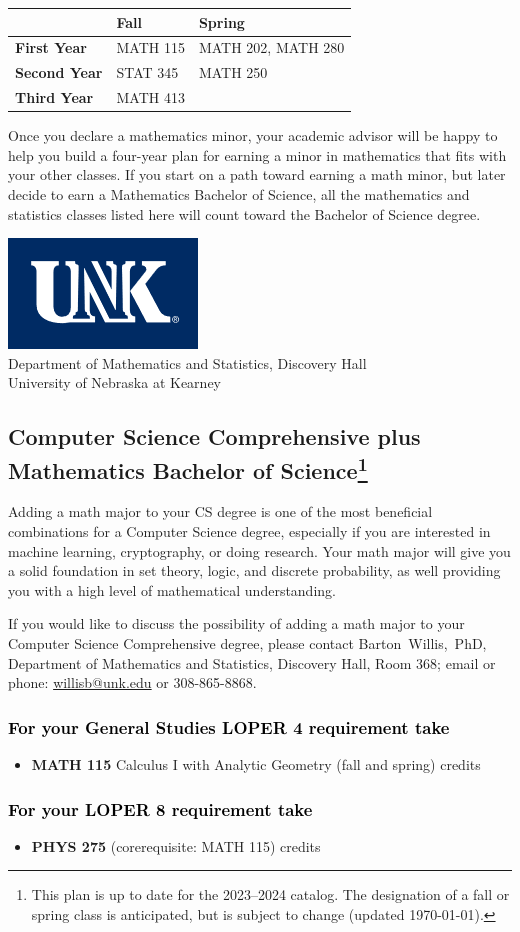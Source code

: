 \documentclass[10pt]{article}
\makeatletter
\newcommand{\calcone}{\textbf{MATH 115} Calculus I with Analytic Geometry (fall and spring) \dotfill 5 credits}
\newcommand{\calconeshort}{MATH 115}
\newcommand{\calctwoshort}{MATH 202}
\newcommand{\foundationsshort}{MATH 250}
\newcommand{\linearshort}{MATH 280}
\newcommand{\discreteshort}{MATH 413}
\newcommand{\appliedstatshort}{STAT 345}
\newcommand{\physics}{\textbf{PHYS 275}  (corerequisite: \calconeshort) \dotfill 3 credits}
\newcommand{\contactbw}{\mbox{Barton Willis, PhD}, Department of Mathematics and Statistics,  Discovery Hall, Room 368;
email or phone: \href{mailto:willisb@unk.edu}{willisb@unk.edu} or 308-865-8868.}
\newcommand{\forinfo}[2]{If you would like to discuss the possibility of adding a math {#1} to your {#2}, please contact \contactbw}
\newcommand{\catalog}{2023--2024 }
\newcommand{\LOPER}{LOPER\xspace}
\newcommand{\myfootnote}{\footnote{This plan is up to date for  the \catalog catalog. The designation of a fall or spring class is 
anticipated, but  is subject to change (updated \today).}}
\newcommand{\myheading}{
\begin{flushleft}
\includegraphics[scale=0.35]{unk-logo}\\
\setcounter{footnote}{0}
\vspace{0.25in}
 \textcolor{unkblue}{Department of Mathematics and Statistics, Discovery Hall} \\
  \textcolor{unkblue}{University of Nebraska at Kearney}
\end{flushleft}}
\newcommand{\mathminor}{
  \begin{center}
   \begin{tabular}[h]{| l | l | l|} 
      \hline
      & \textbf{Fall}         &  \textbf{Spring}  \\ \hline 
      \textbf{First Year} & \calconeshort & \calctwoshort, \linearshort \\  \hline
      \textbf{Second Year} &  \appliedstatshort{} &  \foundationsshort \\ \hline
      \textbf{Third Year} &    \discreteshort              &  \\ \hline
      \end{tabular}
      \end{center}}
\makeatother
\begin{document}
\begin{center}
\mathminor
\end{center}


 \vspace{0.1in}
\noindent Once you declare a mathematics minor, your academic advisor will be happy to help you build a 
four-year plan for earning a minor in mathematics that fits with 
your other classes.  If you start on a path toward earning a math minor, but later decide to 
earn a  Mathematics Bachelor of 
Science, all the mathematics and statistics  classes listed here 
will count toward the Bachelor of Science degree.


\newpage

\myheading



\vspace{-0.1in}
\subsection*{\textbf{\textcolor{unkblue}{Computer Science Comprehensive plus Mathematics Bachelor of Science\myfootnote}}}

Adding a math major to your CS degree is one of the most beneficial combinations for a Computer Science degree, especially if you are interested in machine learning, cryptography,   or doing research.  Your math major  will give you a solid foundation in set theory, logic, and discrete probability, as well providing you with a high level of mathematical understanding. 



\forinfo{major}{Computer Science Comprehensive degree}


\subsubsection*{\textcolor{black}{For your General Studies \LOPER 4 requirement take}}
\begin{itemize}
\item \calcone
\end{itemize}

\subsubsection*{\textcolor{black}{For your \LOPER 8 requirement take}}

\begin{itemize}
   \item \physics 
\end{itemize}
\end{document}
